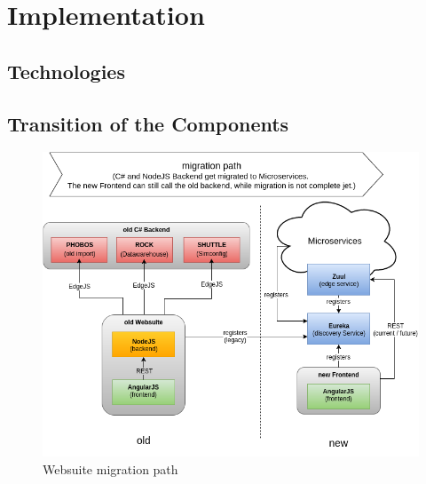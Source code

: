 
\chapter{Implementation}




\section{Technologies}




\section{Transition of the Components}
\begin{figure}[H]
	\centering\includegraphics[width=1\textwidth]{res/Websuite_migration}
	\caption{Websuite migration path}
	\label{fig:websuite-migration}
\end{figure}




